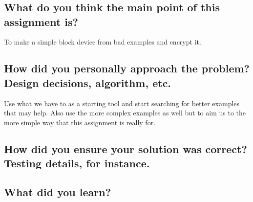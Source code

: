 \documentclass[draftclsnofoot,onecolumn,10pt,compsoc]{IEEEtran}
\begin{document}
\section{}
\subsection{What do you think the main point of this assignment is?}
To make a simple block device from bad examples and encrypt it.  
\subsection{How did you personally approach the problem? Design decisions, algorithm, etc.}
Use what we have to as a starting tool and start searching for better examples that may help. Also use the more complex examples as well but to aim us to the more simple way that this assignment is really for.  
\subsection{How did you ensure your solution was correct? Testing details, for instance.}
\subsection{What did you learn?}
\end{document}
